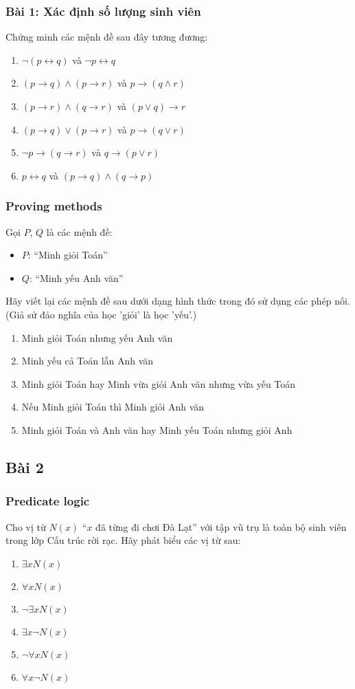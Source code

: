 \documentclass[english,10pt,table]{beamer}
\begin{document}
\frame
{
  \frametitle{Bài 1: Xác định số lượng sinh viên}	
\begin{block}{}
Chứng minh các mệnh đề sau đây tương đương: 
\begin{enumerate}[a]
	\item $\lnot (p \leftrightarrow q) $ và $\lnot p \leftrightarrow q$ 
	\item $(p \to q) \land (p \to r)$ và $p \to (q \land r)$  
	\item $(p \to r) \land (q \to r)$ và $(p \lor q) \to r$
	\item $(p \to q) \lor (p \to r)$ và $p \to (q \lor r)$ 
	\item $\lnot p \to (q \to r)$ và $q \to (p \lor r)$ 
	\item $p \leftrightarrow q$ và $(p \to q) \land (q \to p)$ 
\end{enumerate}
\end{block}
}

\frame
{
  \frametitle{Proving methods}	
\begin{block}{}
Gọi $P$, $Q$ là các mệnh đề: 
\begin{itemize}
	\item $P$: ``Minh giỏi Toán''
	\item $Q$: ``Minh yếu Anh văn''
\end{itemize}
Hãy viết lại các mệnh đề sau dưới dạng hình thức trong đó sử dụng các phép nối. \\
(Giả sử đảo nghĩa của học 'giỏi' là học 'yếu'.)
\begin{enumerate}[a]
\item Minh giỏi Toán nhưng yếu Anh văn
\item Minh yếu cả Toán lẫn Anh văn
\item Minh giỏi Toán hay Minh vừa giỏi Anh văn nhưng vừa yếu Toán
\item Nếu Minh giỏi Toán thì Minh giỏi Anh văn
\item Minh giỏi Toán và Anh văn hay Minh yếu Toán nhưng giỏi Anh
\end{enumerate}

\end{block}
}
\subsection{Bài 2}
\frame
{
  \frametitle{Predicate logic}	
\begin{block}{}
Cho vị từ $N(x)$ ``$x$ đã từng đi chơi Đà Lạt'' với tập vũ trụ là toàn bộ sinh viên trong lớp Cấu trúc rời rạc. 
Hãy phát biểu các vị từ sau:
\begin{enumerate}[a]
	\item $\exists x N(x)$ 
	\item $\forall x N(x)$ 
	\item $\neg \exists x N(x)$ 
 \item $\exists x \neg N(x) $ 
	\item $\neg \forall x N(x)$ 
	\item $\forall x \neg N(x)$
\end{enumerate}
\end{block}
}
\end{document}
